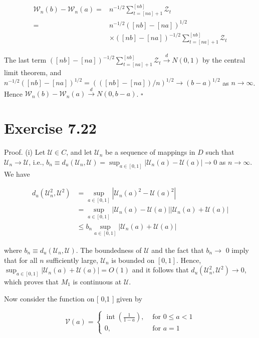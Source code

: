 \documentclass[10pt]{article}
\begin{document}
$$
\begin{aligned}
\mathcal{W}_{n}(b)-\mathcal{W}_{n}(a)= & n^{-1 / 2} \sum_{t=[n a]+1}^{[n b]} \mathcal{Z}_{t} \\
= & n^{-1 / 2}([n b]-[n a])^{1 / 2} \\
& \times([n b]-[n a])^{-1 / 2} \sum_{t=[n a]+1}^{[n b]} \mathcal{Z}_{t}
\end{aligned}
$$

The last term $([n b]-[n a])^{-1 / 2} \sum_{t=[n a]+1}^{[n b]} \mathcal{Z}_{t} \xrightarrow{d} N(0,1)$ by the central limit theorem, and $n^{-1 / 2}([n b]-[n a])^{1 / 2}=(([n b]-[n a]) / n)^{1 / 2} \rightarrow(b-a)^{1 / 2}$ as $n \rightarrow \infty$. Hence $\mathcal{W}_{n}(b)-\mathcal{W}_{n}(a) \xrightarrow{d} N(0, b-a)$. \(\square\)

\section*{Exercise 7.22}
Proof. (i) Let $\mathcal{U} \in C$, and let $\mathcal{U}_{n}$ be a sequence of mappings in $D$ such that $\mathcal{U}_{n} \rightarrow \mathcal{U}$, i.e., $b_{n} \equiv d_{u}\left(\mathcal{U}_{n}, \mathcal{U}\right)=\sup _{a \in[0,1]}\left|\mathcal{U}_{n}(a)-\mathcal{U}(a)\right| \rightarrow 0$ as $n \rightarrow \infty$. We have

$$
\begin{aligned}
d_{u}\left(\mathcal{U}_{n}^{2}, \mathcal{U}^{2}\right) & =\sup _{a \in[0,1]}\left|\mathcal{U}_{n}(a)^{2}-\mathcal{U}(a)^{2}\right| \\
& =\sup _{a \in[0,1]}\left|\mathcal{U}_{n}(a)-\mathcal{U}(a)\right|\left|\mathcal{U}_{n}(a)+\mathcal{U}(a)\right| \\
& \leq b_{n} \sup _{a \in[0,1]}\left|\mathcal{U}_{n}(a)+\mathcal{U}(a)\right|
\end{aligned}
$$

where $b_{n} \equiv d_{u}\left(\mathcal{U}_{n}, \mathcal{U}\right)$. The boundedness of $\mathcal{U}$ and the fact that $b_{n} \rightarrow$ 0 imply that for all $n$ sufficiently large, $\mathcal{U}_{n}$ is bounded on $[0,1]$. Hence, $\sup _{a \in[0,1]}\left|\mathcal{U}_{n}(a)+\mathcal{U}(a)\right|=O(1)$ and it follows that $d_{u}\left(\mathcal{U}_{n}^{2}, \mathcal{U}^{2}\right) \rightarrow 0$, which proves that $M_{1}$ is continuous at $\mathcal{U}$.

Now consider the function on [ 0,1 ] given by

$$
\mathcal{V}(a)=\left\{\begin{array}{cl}
\operatorname{int}\left(\frac{1}{1-a}\right), & \text { for } 0 \leq a<1 \\
0, & \text { for } a=1
\end{array}\right.
$$
\end{document}
